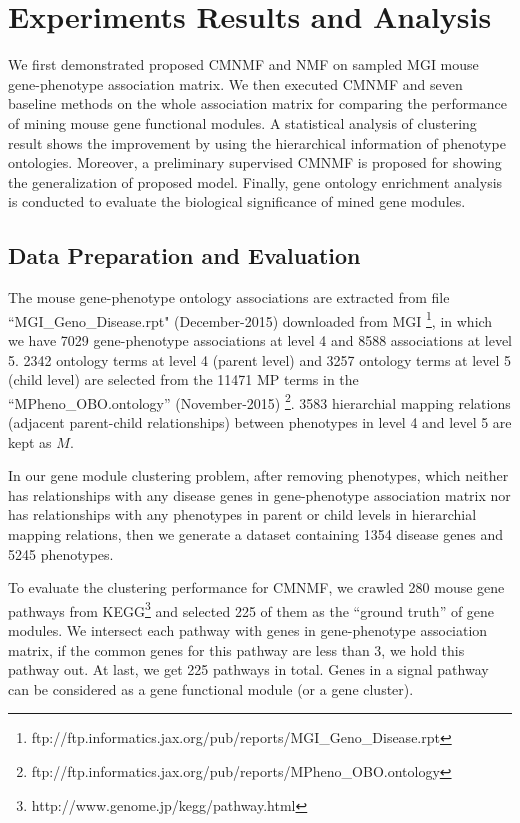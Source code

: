 \documentclass{bmcart}
\begin{document}
\section*{Experiments Results and Analysis}

We first demonstrated proposed CMNMF and NMF on sampled MGI mouse gene-phenotype association matrix. We then executed CMNMF and seven baseline methods on the whole association matrix for comparing the performance of mining mouse gene functional modules. A statistical analysis of clustering result shows the improvement by using the hierarchical information of phenotype ontologies. Moreover, a preliminary supervised CMNMF is proposed for showing the generalization of proposed model. Finally, gene ontology enrichment analysis is conducted to evaluate the biological significance of mined gene modules.

\subsection*{\textbf{Data Preparation and Evaluation}}
 The mouse gene-phenotype ontology associations are extracted from file ``MGI\_Geno\_Disease.rpt" (December-2015) downloaded from MGI \footnote{ftp://ftp.informatics.jax.org/pub/reports/MGI\_Geno\_Disease.rpt}, in which we have 7029 gene-phenotype associations at level 4 and 8588 associations at level 5. 2342 ontology terms at level 4 (parent level) and 3257 ontology terms at level 5 (child level)  are selected from the 11471 MP terms in the ``MPheno\_OBO.ontology'' (November-2015) \footnote{ftp://ftp.informatics.jax.org/pub/reports/MPheno\_OBO.ontology}. 3583 hierarchial mapping relations (adjacent parent-child relationships) between phenotypes in level 4 and level 5 are kept as $M$.

In our gene module clustering problem,
after removing phenotypes, which neither has relationships with any disease genes in gene-phenotype association matrix nor has relationships with any phenotypes in parent or child levels in hierarchial mapping relations, then we generate a dataset containing 1354 disease genes and 5245 phenotypes.

To evaluate the clustering performance for CMNMF, we crawled 280 mouse gene pathways from KEGG\footnote{http://www.genome.jp/kegg/pathway.html} and selected 225 of them as the ``ground truth'' of gene modules. We intersect each pathway with genes in gene-phenotype association matrix, if the common genes for this pathway are less than 3, we hold this pathway out. At last, we get 225 pathways in total. Genes in a signal pathway can be considered as a gene functional module (or a gene cluster).
\end{document}
